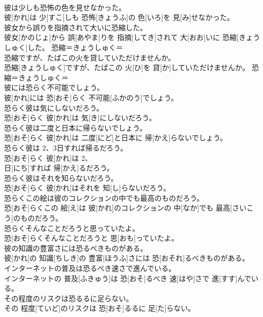 \documentclass[8pt]{extreport}
\begin{document}
\begin{CJK}{UTF8}{min}
{\\	彼は少しも恐怖の色を見せなかった。	
\\	彼[かれ]は 少[すこ]しも 恐怖[きょうふ]の 色[いろ]を 見[み]せなかった。	
\\	彼女から誤りを指摘されて大いに恐縮した。	
\\	彼女[かのじょ]から 誤[あやま]りを 指摘[してき]されて 大[おお]いに 恐縮[きょうしゅく]した。	恐縮＝きょうしゅく＝ 
\\	恐縮ですが、たばこの火を貸していただけませんか。	
\\	恐縮[きょうしゅく]ですが、たばこの 火[ひ]を 貸[か]していただけませんか。	恐縮＝きょうしゅく＝ 
\\	彼には恐らく不可能でしょう。	
\\	彼[かれ]には 恐[おそ]らく 不可能[ふかのう]でしょう。	
\\	恐らく彼は気にしないだろう。	
\\	恐[おそ]らく 彼[かれ]は 気[き]にしないだろう。	
\\	恐らく彼は二度と日本に帰らないでしょう。	
\\	恐[おそ]らく 彼[かれ]は 二度[にど]と日本に 帰[かえ]らないでしょう。	
\\	恐らく彼は 2、3日すれば帰るだろう。	
\\	恐[おそ]らく 彼[かれ]は 2、 
\\	日[にち]すれば 帰[かえ]るだろう。	
\\	恐らく彼はそれを知らないだろう。	
\\	恐[おそ]らく 彼[かれ]はそれを 知[し]らないだろう。	
\\	恐らくこの絵は彼のコレクションの中でも最高のものだろう。	
\\	恐[おそ]らくこの 絵[え]は 彼[かれ]のコレクションの 中[なか]でも 最高[さいこう]のものだろう。	
\\	恐らくそんなことだろうと思っていたよ。	
\\	恐[おそ]らくそんなことだろうと 思[おも]っていたよ。	
\\	彼の知識の豊富さには恐るべきものがある。	
\\	彼[かれ]の 知識[ちしき]の 豊富[ほうふ]さには 恐[おそれ]るべきものがある。	
\\	インターネットの普及は恐るべき速さで進んでいる。	
\\	インターネットの 普及[ふきゅう]は 恐[おそ]るべき 速[はや]さで 進[すす]んでいる。	
\\	その程度のリスクは恐るるに足らない。	
\\	その 程度[ていど]のリスクは 恐[おそ]るるに 足[た]らない。	
}
\end{CJK}
\end{document}
